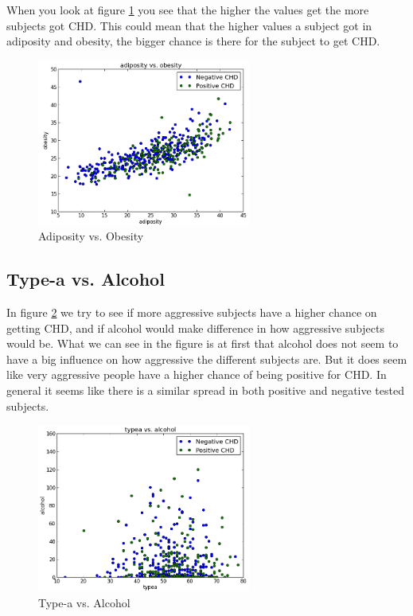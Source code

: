 When you look at figure \ref{ObeAsi} you see that the higher the values get the more subjects got CHD. This could mean that the higher values a subject got in adiposity and obesity, the bigger chance is there for the subject to get CHD.

\begin{figure}[H]
\centering
\includegraphics[width=7cm, keepaspectratio=true]{pictures/adiposityObesity.png}
\vspace{-0.4cm}
\caption{\footnotesize Adiposity vs. Obesity}
\label{ObeAsi}
\end{figure}

\subsection{Type-a vs. Alcohol}

In figure \ref{typeAlco} we try to see if more aggressive subjects have a higher chance on getting CHD, and if alcohol would make difference in how aggressive subjects would be. What we can see in the figure is at first that alcohol does not seem to have a big influence on how aggressive the different subjects are. But it does seem like very aggressive people have a higher chance of being positive for CHD. In general it seems like there is a similar spread in both positive and negative tested subjects.

\begin{figure}[H]
\centering
\includegraphics[width=7cm, keepaspectratio=true]{pictures/typeaalcohol.png}
\vspace{-0.4cm}
\caption{\footnotesize Type-a vs. Alcohol}
\label{typeAlco}
\end{figure}